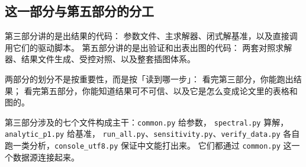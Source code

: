 \subsection{这一部分与第五部分的分工}

第三部分讲的是出结果的代码：
参数文件、主求解器、闭式解基准，以及直接调用它们的驱动脚本。
第五部分讲的是出验证和出表出图的代码：
两套对照求解器、结果文件生成、受控对照、以及整套插图体系。

两部分的划分不是按重要性，而是按「读到哪一步」：
看完第三部分，你能跑出结果；
看完第五部分，你能知道结果可不可信、以及它是怎么变成论文里的表格和图的。

\keypoint
第三部分涉及的七个文件构成主干：\texttt{common.py} 给参数，
\texttt{spectral.py} 算解，\texttt{analytic\_p1.py} 给基准，
\texttt{run\_all.py}、\texttt{sensitivity.py}、\texttt{verify\_data.py}
各自跑一类分析，\texttt{console\_utf8.py} 保证中文能打出来。
它们都通过 \texttt{common.py} 这一个数据源连接起来。
